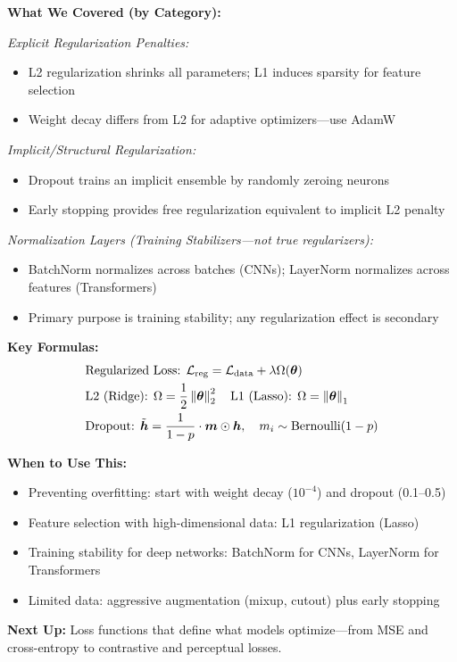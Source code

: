 \documentclass[../../main.tex]{subfiles}
\begin{document}
\begin{chaptersummary}
\textbf{What We Covered (by Category):}

\textit{Explicit Regularization Penalties:}
\begin{itemize}
    \item L2 regularization shrinks all parameters; L1 induces sparsity for feature selection
    \item Weight decay differs from L2 for adaptive optimizers---use AdamW
\end{itemize}

\textit{Implicit/Structural Regularization:}
\begin{itemize}
    \item Dropout trains an implicit ensemble by randomly zeroing neurons
    \item Early stopping provides free regularization equivalent to implicit L2 penalty
\end{itemize}

\textit{Normalization Layers (Training Stabilizers---not true regularizers):}
\begin{itemize}
    \item BatchNorm normalizes across batches (CNNs); LayerNorm normalizes across features (Transformers)
    \item Primary purpose is training stability; any regularization effect is secondary
\end{itemize}

\textbf{Key Formulas:}
\begin{align*}
    &\text{Regularized Loss: } \mathcal{L}_{\text{reg}} = \mathcal{L}_{\text{data}} + \lambda \Omega(\boldsymbol{\theta}) \\
    &\text{L2 (Ridge): } \Omega = \frac{1}{2}\left\lVert \boldsymbol{\theta} \right\rVert_2^2 \quad \text{L1 (Lasso): } \Omega = \left\lVert \boldsymbol{\theta} \right\rVert_1 \\
    &\text{Dropout: } \tilde{\boldsymbol{h}} = \frac{1}{1-p} \cdot \boldsymbol{m} \odot \boldsymbol{h}, \quad m_i \sim \text{Bernoulli}(1-p)
\end{align*}

\textbf{When to Use This:}
\begin{itemize}
    \item Preventing overfitting: start with weight decay ($10^{-4}$) and dropout (0.1--0.5)
    \item Feature selection with high-dimensional data: L1 regularization (Lasso)
    \item Training stability for deep networks: BatchNorm for CNNs, LayerNorm for Transformers
    \item Limited data: aggressive augmentation (mixup, cutout) plus early stopping
\end{itemize}

\textbf{Next Up:} Loss functions that define what models optimize---from MSE and cross-entropy to contrastive and perceptual losses.
\end{chaptersummary}
\end{document}
